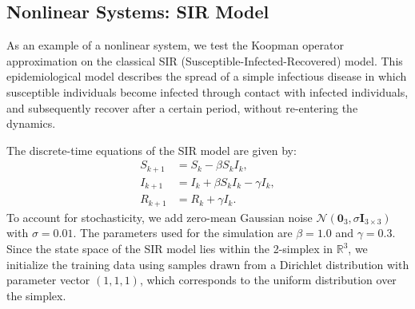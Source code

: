 \documentclass{article}
\begin{document}
\subsection*{Nonlinear Systems: SIR Model}

As an example of a nonlinear system, we test the Koopman operator approximation on the classical SIR (Susceptible-Infected-Recovered) model. This epidemiological model describes the spread of a simple infectious disease in which susceptible individuals become infected through contact with infected individuals, and subsequently recover after a certain period, without re-entering the dynamics.

The discrete-time equations of the SIR model are given by:
\[
\begin{aligned}
    S_{k+1} &= S_k - \beta S_k I_k, \\
    I_{k+1} &= I_k + \beta S_k I_k - \gamma I_k, \\
    R_{k+1} &= R_k + \gamma I_k.
\end{aligned}
\]
To account for stochasticity, we add zero-mean Gaussian noise $\mathcal{N}(\mathbf{0}_3, \sigma \mathbf{I}_{3\times 3})$ with $\sigma = 0.01$. The parameters used for the simulation are $\beta = 1.0$ and $\gamma = 0.3$. Since the state space of the SIR model lies within the 2-simplex in $\mathbb{R}^3$, we initialize the training data using samples drawn from a Dirichlet distribution with parameter vector $(1,1,1)$, which corresponds to the uniform distribution over the simplex.
\end{document}
